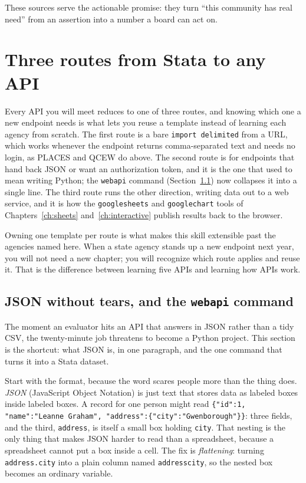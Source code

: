 \documentclass[
    a4paper,
    fontsize=10pt,
    twoside=true,
    numbers=noenddot,
]{kaobook}
\begin{document}
These sources serve the actionable promise: they turn \enquote{this community has real need} from an assertion into a number a board can act on.

\section{Three routes from Stata to any API}\label{sec:threeroutes}
Every API you will meet reduces to one of three routes, and knowing which one a new endpoint needs is what lets you reuse a template instead of learning each agency from scratch. The first route is a bare \texttt{import delimited} from a URL, which works whenever the endpoint returns comma-separated text and needs no login, as PLACES and QCEW do above. The second route is for endpoints that hand back JSON or want an authorization token, and it is the one that used to mean writing Python; the \texttt{webapi} command (Section~\ref{sec:webapi}) now collapses it into a single line. The third route runs the other direction, writing data out to a web service, and it is how the \texttt{googlesheets} and \texttt{googlechart} tools of Chapters~\ref{ch:sheets} and~\ref{ch:interactive} publish results back to the browser.

Owning one template per route is what makes this skill extensible past the agencies named here. When a state agency stands up a new endpoint next year, you will not need a new chapter; you will recognize which route applies and reuse it. That is the difference between learning five APIs and learning how APIs work.

\subsection{JSON without tears, and the \texttt{webapi} command}\label{sec:webapi}
The moment an evaluator hits an API that answers in JSON rather than a tidy CSV, the twenty-minute job threatens to become a Python project. This section is the shortcut: what JSON is, in one paragraph, and the one command that turns it into a Stata dataset.

Start with the format, because the word scares people more than the thing does. \emph{JSON} (JavaScript Object Notation) is just text that stores data as labeled boxes inside labeled boxes. A record for one person might read \texttt{\{"id":1, "name":"Leanne Graham", "address":\{"city":"Gwenborough"\}\}}: three fields, and the third, \texttt{address}, is itself a small box holding \texttt{city}. That nesting is the only thing that makes JSON harder to read than a spreadsheet, because a spreadsheet cannot put a box inside a cell. The fix is \emph{flattening}: turning \texttt{address.city} into a plain column named \texttt{addresscity}, so the nested box becomes an ordinary variable.
\end{document}
